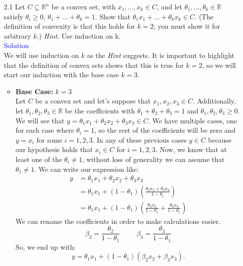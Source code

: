 \documentclass[12pt, oneside]{article}%
\def\R{{\mathbb R}}
\begin{document}
\begin{enumerate}[font=\bfseries]
\item [2.1] Let $C\subseteq \R^n$ be a convex set, with $x_1, \dots , x_k\in C$, and let $\theta_1, \dots , \theta_k\in \R$ satisfy $\theta_i \geq 0$, $\theta_1 + \dots + \theta_k = 1$. Show that $\theta_1x_1 + \dots + \theta_kx_k\in C$. (The definition of convexity is that this holds for $k = 2$; you must show it for arbitrary $k$.) \textit{Hint}. Use induction on k.\\

\Large\textsf{\textcolor{blue}{Solution}}
\normalsize\\

We will use induction on $k$ as the \textit{Hint} suggests. It is important to highlight that the definition of convex sets shows that this is true for $k=2$, so we will start our induction with the base case $k=3$.
\begin{itemize}
    \item \textbf{Base Case: }$k=3$\\
    Let $C$ be a convex set and let's suppose that $x_1,x_2,x_3 \in C$. Additionally, let $\theta_1, \theta_2, \theta_3 \in \R$ be the coefficients with $\theta_1+\theta_2 + \theta_3=1$ and $\theta_1, \theta_2, \theta_3 \geq 0$. We will see that $y=\theta_1x_1+ \theta_2x_2+\theta_3x_3\in C$. We have multiple cases, one for each case where $\theta_i=1$, so the rest of the coefficients will be zero and $y=x_i$ for some $i=1,2,3$. In any of these previous cases $y\in C$ because our hypothesis holds that $x_i \in C$ for $i=1,2,3$. Now, we know that at least one of the $\theta_i\neq 1$, without loss of generality we can assume that $\theta_1\neq1$. We can write our expression like: 
    \begin{align*}
    y&=\theta_1x_1+ \theta_2x_2+\theta_3x_3\\
    &=\theta_1x_1+ (1-\theta_1)\left(\frac{\theta_2x_2+\theta_3x_3}{1-\theta_1}\right)\\
    &=\theta_1x_1+ (1-\theta_1)\left(\frac{\theta_2x_2}{1-\theta_1}+\frac{\theta_3x_3}{1-\theta_1}\right)
    \end{align*}
    We can rename the coefficients in order to make calculations easier.
    $$\beta_2 = \frac{\theta_2}{1-\theta_1} \hspace{1cm} \beta_3 = \frac{\theta_3}{1-\theta_1}$$
    So, we end up with:
    \begin{equation}
        y=\theta_1x_1+(1-\theta_1)(\beta_2x_2+\beta_3x_3).
        \label{eqn:Eq1}
    \end{equation}

\end{itemize}
\end{enumerate}
\end{document}
